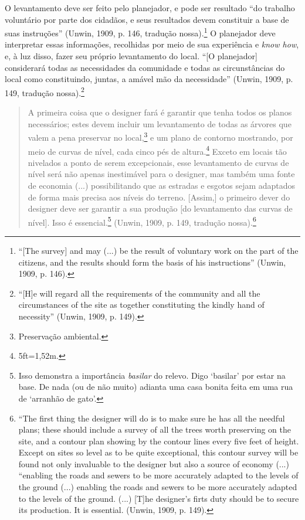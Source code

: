 \documentclass[12pt, a4paper]{book} %
\begin{document}
        O levantamento deve ser feito pelo planejador, e pode ser resultado ``do trabalho voluntário por parte dos cidadãos, e seus resultados devem constituir a base de suas instruções'' (Unwin, 1909, p. 146, tradução nossa).\footnote[29]{``[The survey] and may (...) be the result of voluntary work on the part of the citizens, and the results should form the basis of his instructions'' (Unwin, 1909, p. 146).} O planejador deve interpretar essas informações, recolhidas por meio de sua experiência e \textit{know how}, e, à luz disso, fazer seu próprio levantamento do local. ``[O planejador] considerará todas as necessidades da comunidade e todas as circunstâncias do local como constituindo, juntas, a amável mão da necessidade'' (Unwin, 1909, p. 149, tradução nossa).\footnote[30]{``[H]e will regard all the requirements of the community and all the circumstances of the site as together constituting the kindly hand of necessity'' (Unwin, 1909, p. 149).}

        \begin{quotation}
            A primeira coisa que o designer fará é garantir que tenha todos os planos necessários; estes devem incluir um levantamento de todas as árvores que valem a pena preservar no local,\footnote[31]{Preservação ambiental.} e um plano de contorno mostrando, por meio de curvas de nível, cada cinco pés de altura.\footnote[32]{5ft=1,52m.} Exceto em locais tão nivelados a ponto de serem excepcionais, esse levantamento de curvas de nível será não apenas inestimável para o designer, mas também uma fonte de economia (...) possibilitando que as estradas e esgotos sejam adaptados de forma mais precisa aos níveis do terreno. [Assim,] o primeiro dever do designer deve ser garantir a sua produção [do levantamento das curvas de nível]. Isso é essencial.\footnote[33]{Isso demonstra a importância \textit{basilar} do relevo. Digo `basilar' por estar na base. De nada (ou de não muito) adianta uma casa bonita feita em uma rua de `arranhão de gato'.} (Unwin, 1909, p. 149, tradução nossa).\footnote[34]{``The first thing the designer will do is to make sure he has all the needful plans; these should include a survey of all the trees worth preserving on the site, and a contour plan showing by the contour lines every five feet of height. Except on sites so level as to be quite exceptional, this contour survey will be found not only invaluable to the designer but also a source of economy (...) ``enabling the roads and sewers to be more accurately adapted to the levels of the ground (...) enabling the roads and sewers to be more accurately adapted to the levels of the ground. (...) [T]he designer's firts duty should be to secure its production. It is essential. (Unwin, 1909, p. 149).}
        \end{quotation}
\end{document}
